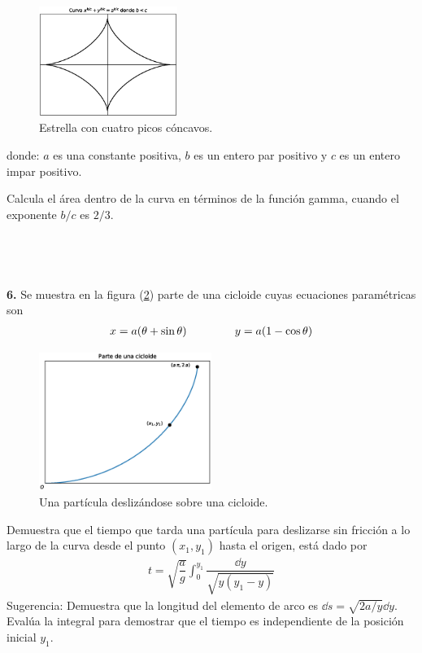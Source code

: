 \begin{figure}
    \centering
    \includegraphics[width=0.4\textwidth]{Imagenes/plot_curva_estrella_01.eps}
    \caption{Estrella con cuatro picos cóncavos.}
    \label{fig:figura_p01}
\end{figure}
donde: $a$ es una constante positiva, $b$ es un entero par positivo y $c$ es un entero impar positivo.
\par
Calcula el área dentro de la curva en términos de la función gamma, cuando el exponente $b/c$ es $2/3$.
\\\hspace*{\fill}
\\\hspace*{\fill}
\\\hspace*{\fill}
\\\hspace*{\fill}
\\\hspace*{\fill}
\textbf{6.} Se muestra en la figura (\ref{fig:figura_p02}) parte de una cicloide cuyas ecuaciones paramétricas son
\begin{align*}
x = a (\theta + \sin \theta) \hspace{1.5cm} y = a (1 - \cos \theta)
\end{align*}

\begin{figure}
    \centering
    \includegraphics[width=0.5\textwidth]{Imagenes/plot_cicloide.eps}
    \caption{Una partícula deslizándose sobre una cicloide.}
    \label{fig:figura_p02}
\end{figure}

Demuestra que el tiempo que tarda una partícula para deslizarse sin fricción a lo largo de la curva desde el punto $(x_{1}, y_{1})$ hasta el origen, está dado por
\begin{align*}
t = \sqrt{\dfrac{a}{g}} \int_{0}^{y_{1}} \dfrac{\dd{y}}{\sqrt{y (y_{1}- y)}}
\end{align*}
Sugerencia: Demuestra que la longitud del elemento de arco es $\dd{s} = \sqrt{2a/y} \dd{y}$. Evalúa la integral para demostrar que el tiempo es independiente de la posición inicial $y_{1}$.
